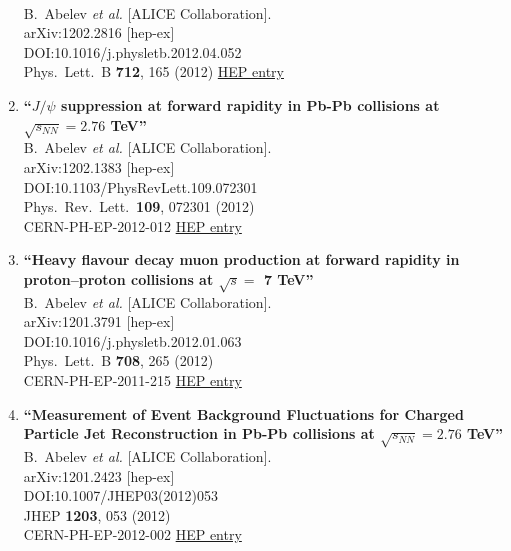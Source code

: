 \begin{enumerate}
  \\{}B.~Abelev {\it et al.} [ALICE Collaboration].
  \\{}arXiv:1202.2816 [hep-ex]
  \\{}DOI:10.1016/j.physletb.2012.04.052
  \\{}Phys.\ Lett.\ B {\bf 712}, 165 (2012)
\href{http://inspirehep.net/record/1088833}{HEP entry}
\item%
{\bf ``$J/\psi$ suppression at forward rapidity in Pb-Pb collisions at $\sqrt{s_{NN}}=2.76$ TeV''}
  \\{}B.~Abelev {\it et al.} [ALICE Collaboration].
  \\{}arXiv:1202.1383 [hep-ex]
  \\{}DOI:10.1103/PhysRevLett.109.072301
  \\{}Phys.\ Rev.\ Lett.\  {\bf 109}, 072301 (2012)
  \\{}CERN-PH-EP-2012-012
\href{http://inspirehep.net/record/1088222}{HEP entry}
\item%
{\bf ``Heavy flavour decay muon production at forward rapidity in proton–proton collisions at $\sqrt{s} =$ 7 TeV''}
  \\{}B.~Abelev {\it et al.} [ALICE Collaboration].
  \\{}arXiv:1201.3791 [hep-ex]
  \\{}DOI:10.1016/j.physletb.2012.01.063
  \\{}Phys.\ Lett.\ B {\bf 708}, 265 (2012)
  \\{}CERN-PH-EP-2011-215
\href{http://inspirehep.net/record/1084981}{HEP entry}
\item%
{\bf ``Measurement of Event Background Fluctuations for Charged Particle Jet Reconstruction in Pb-Pb collisions at $\sqrt{s_{NN}} = 2.76$ TeV''}
  \\{}B.~Abelev {\it et al.} [ALICE Collaboration].
  \\{}arXiv:1201.2423 [hep-ex]
  \\{}DOI:10.1007/JHEP03(2012)053
  \\{}JHEP {\bf 1203}, 053 (2012)
  \\{}CERN-PH-EP-2012-002
\href{http://inspirehep.net/record/1084331}{HEP entry}

\end{enumerate}